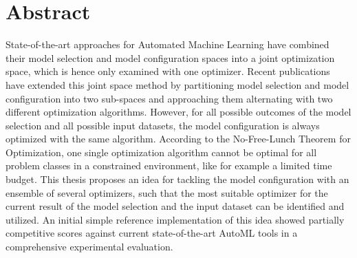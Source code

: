 %
\chapter*{Abstract}
\label{sec:abstract}
\vspace*{-15mm}

State-of-the-art approaches for Automated Machine Learning have combined their model selection and model configuration spaces into a joint optimization space, which is hence only examined with one optimizer.
Recent publications have extended this joint space method by partitioning model selection and model configuration into two sub-spaces and approaching them alternating with two different optimization algorithms.
However, for all possible outcomes of the model selection and all possible input datasets, the model configuration is always optimized with the same algorithm.
According to the No-Free-Lunch Theorem for Optimization, one single optimization algorithm cannot be optimal for all problem classes in a constrained environment, like for example a limited time budget.
This thesis proposes an idea for tackling the model configuration with an ensemble of several optimizers, such that the most suitable optimizer for the current result of the model selection and the input dataset can be identified and utilized.
An initial simple reference implementation of this idea showed partially competitive scores against current state-of-the-art AutoML tools in a comprehensive experimental evaluation.
\vspace*{10mm}


